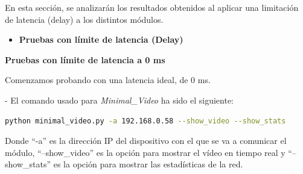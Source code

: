 En esta sección, se analizarán los resultados obtenidos al aplicar una limitación de latencia (delay) a los distintos módulos.

\begin{itemize}
    \item \textbf{Pruebas con límite de latencia (Delay)}
\end{itemize}

\textbf{Pruebas con límite de latencia a 0 ms}
\vspace{\baselineskip}

Comenzamos probando con una latencia ideal, de 0 ms.

- El comando usado para \textit{Minimal\_Video} ha sido el siguiente:
\vspace{\baselineskip}

\begin{lstlisting}[language=bash]
python minimal_video.py -a 192.168.0.58 --show_video --show_stats
\end{lstlisting}
Donde ``-a'' es la dirección IP del dispositivo con el que se va a comunicar el módulo, ``--show\_video'' es la opción para mostrar el vídeo en tiempo real y ``--show\_stats'' es la opción para mostrar las estadísticas de la red.
\vspace{\baselineskip}


